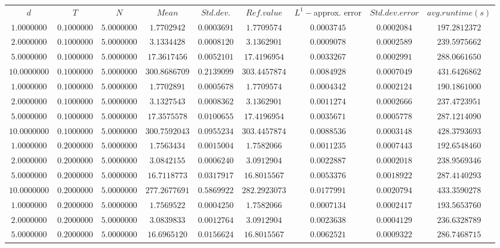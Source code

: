 \begin{tabular}{ccccccccc}
$d$ & $T$ & $N$ & $Mean$ & $Std. dev.$ & $Ref. value$ & $L^1-$approx. error & $Std. dev. error$ & $avg. runtime (s)$\\
$1.0000000$ & $0.1000000$ & $5.0000000$ & $1.7702942$ & $0.0003691$ & $1.7709574$ & $0.0003745$ & $0.0002084$ & $197.2812372$\\
$2.0000000$ & $0.1000000$ & $5.0000000$ & $3.1334428$ & $0.0008120$ & $3.1362901$ & $0.0009078$ & $0.0002589$ & $239.5975662$\\
$5.0000000$ & $0.1000000$ & $5.0000000$ & $17.3617456$ & $0.0052101$ & $17.4196954$ & $0.0033267$ & $0.0002991$ & $288.0661650$\\
$10.0000000$ & $0.1000000$ & $5.0000000$ & $300.8686709$ & $0.2139099$ & $303.4457874$ & $0.0084928$ & $0.0007049$ & $431.6426862$\\
$1.0000000$ & $0.1000000$ & $5.0000000$ & $1.7702891$ & $0.0005678$ & $1.7709574$ & $0.0004342$ & $0.0002124$ & $190.1861000$\\
$2.0000000$ & $0.1000000$ & $5.0000000$ & $3.1327543$ & $0.0008362$ & $3.1362901$ & $0.0011274$ & $0.0002666$ & $237.4723951$\\
$5.0000000$ & $0.1000000$ & $5.0000000$ & $17.3575578$ & $0.0100655$ & $17.4196954$ & $0.0035671$ & $0.0005778$ & $287.1214090$\\
$10.0000000$ & $0.1000000$ & $5.0000000$ & $300.7592043$ & $0.0955234$ & $303.4457874$ & $0.0088536$ & $0.0003148$ & $428.3793693$\\
$1.0000000$ & $0.2000000$ & $5.0000000$ & $1.7563434$ & $0.0015004$ & $1.7582066$ & $0.0011235$ & $0.0007443$ & $192.6548460$\\
$2.0000000$ & $0.2000000$ & $5.0000000$ & $3.0842155$ & $0.0006240$ & $3.0912904$ & $0.0022887$ & $0.0002018$ & $238.9569346$\\
$5.0000000$ & $0.2000000$ & $5.0000000$ & $16.7118773$ & $0.0317917$ & $16.8015567$ & $0.0053376$ & $0.0018922$ & $287.4140293$\\
$10.0000000$ & $0.2000000$ & $5.0000000$ & $277.2677691$ & $0.5869922$ & $282.2923073$ & $0.0177991$ & $0.0020794$ & $433.3590278$\\
$1.0000000$ & $0.2000000$ & $5.0000000$ & $1.7569522$ & $0.0004250$ & $1.7582066$ & $0.0007134$ & $0.0002417$ & $193.5653760$\\
$2.0000000$ & $0.2000000$ & $5.0000000$ & $3.0839833$ & $0.0012764$ & $3.0912904$ & $0.0023638$ & $0.0004129$ & $236.6328789$\\
$5.0000000$ & $0.2000000$ & $5.0000000$ & $16.6965120$ & $0.0156624$ & $16.8015567$ & $0.0062521$ & $0.0009322$ & $286.7468715$\\

\end{tabular}
